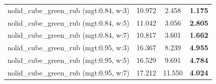 \begin{table}[H]
{\begin{tabular}{l ccc}
        nolid\_cube\_green\_rub (mgt:0.84, w:3) & 10.972 & 2.458 & \textbf{1.175} \\
        nolid\_cube\_green\_rub (mgt:0.84, w:5) & 11.042 & 3.056 & \textbf{2.805} \\
        nolid\_cube\_green\_rub (mgt:0.84, w:7) & 10.817 & 3.601 & \textbf{1.662} \\
        nolid\_cube\_green\_rub (mgt:0.95, w:3) & 16.367 & 8.239 & \textbf{4.955} \\
        nolid\_cube\_green\_rub (mgt:0.95, w:5) & 16.529 & 9.691 & \textbf{4.784} \\
        nolid\_cube\_green\_rub (mgt:0.95, w:7) & 17.212 & 11.550 & \textbf{4.024} \\
        \bottomrule
    \end{tabular}
    }
\end{table}
